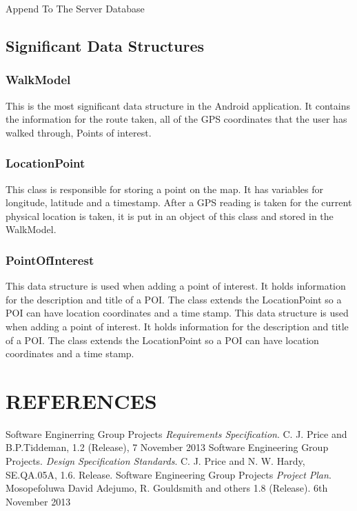 \documentclass[12pt]{article}
\makeatletter
\renewcommand{\paragraph}{
  \@startsection{paragraph}{4}
  {\z@}{3.25ex \@plus -10em \@minus 1em}{0.1em}
  {\normalfont\normalsize\bfseries}
}
\makeatother
\begin{document}
\paragraph{Append To The Server Database}

\subsection{Significant Data Structures}
\subsubsection{WalkModel}
This is the most significant data structure in the Android application. It contains the information for the route taken,
all of the GPS coordinates that the user has walked through, Points of interest.
\subsubsection{LocationPoint}
This class is responsible for storing a point on the map. It has variables for longitude, latitude and a timestamp.
After a GPS reading is taken for the current physical location is taken, it is put in an object
of this class and stored in the WalkModel.
\subsubsection{PointOfInterest}
This data structure is used when adding a point of interest. It holds information for the description and title of a POI.
The class extends the LocationPoint so a POI can have location coordinates and a time
stamp.
This data structure is used when adding a point of interest. It holds information for the description and title of a POI.
The class extends the LocationPoint so a POI can have location coordinates and a time
stamp.
\newpage 
\section{REFERENCES}
\begin{thebibliography}{0}
  Software Enginerring Group Projects
  \emph{Requirements Specification}.
   C. J. Price and B.P.Tiddeman, 
   1.2 (Release), 
   7 November 2013
Software Engineering Group Projects. 
\emph{Design Specification Standards}.
	C. J. Price and N. W. Hardy, 
	SE.QA.05A,
	1.6. Release.
Software Engineering Group Projects
\emph{ Project Plan}.
Mosopefoluwa David Adejumo, R. Gouldsmith and others 1.8
(Release). 6th November 2013
\end{thebibliography}
\newpage
\end{document}
